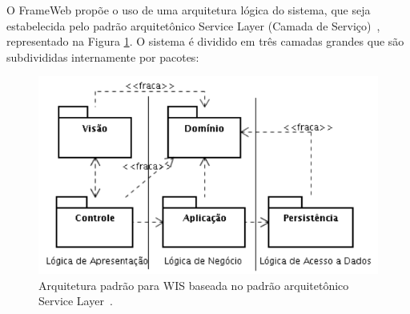 O FrameWeb propõe o uso de uma arquitetura lógica do sistema, que seja estabelecida pelo padrão arquitetônico Service Layer (Camada de Serviço)~, representado na Figura \ref{fig-ref-service-layer}. O sistema é dividido em três camadas grandes que são subdivididas internamente por pacotes:                            

\begin{figure}[h]
	\centering
	\includegraphics[scale=.5]{figuras/fig-ref-service-layer} 
	\caption{Arquitetura padrão para WIS baseada no padrão arquitetônico Service Layer~\cite{fowler:peaa02}.}
	\label{fig-ref-service-layer}
\end{figure}


